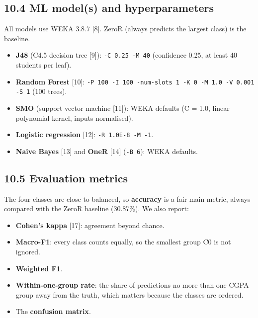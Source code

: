 \documentclass[11pt,a4paper]{article}
\begin{document}
\subsection{10.4 ML model(s) and hyperparameters}
All models use WEKA 3.8.7 [8]. ZeroR (always predicts the largest class) is the baseline.
\begin{itemize}
\item \textbf{J48} (C4.5 decision tree [9]): \texttt{-C 0.25 -M 40} (confidence 0.25, at least 40 students per leaf).
\item \textbf{Random Forest} [10]: \texttt{-P 100 -I 100 -num-slots 1 -K 0 -M 1.0 -V 0.001 -S 1} (100 trees).
\item \textbf{SMO} (support vector machine [11]): WEKA defaults (C = 1.0, linear polynomial kernel, inputs normalised).
\item \textbf{Logistic regression} [12]: \texttt{-R 1.0E-8 -M -1}.
\item \textbf{Naive Bayes} [13] and \textbf{OneR} [14] (\texttt{-B 6}): WEKA defaults.
\end{itemize}

\subsection{10.5 Evaluation metrics}
The four classes are close to balanced, so \textbf{accuracy} is a fair main metric, always compared with the ZeroR baseline (30.87\%). We also report:
\begin{itemize}
\item \textbf{Cohen's kappa} [17]: agreement beyond chance.
\item \textbf{Macro-F1}: every class counts equally, so the smallest group C0 is not ignored.
\item \textbf{Weighted F1}.
\item \textbf{Within-one-group rate}: the share of predictions no more than one CGPA group away from the truth, which matters because the classes are ordered.
\item The \textbf{confusion matrix}.
\end{itemize}
\end{document}
